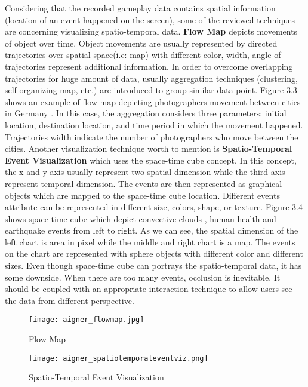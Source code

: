 Considering that the recorded gameplay data contains spatial information (location of an event happened on the screen), some of the reviewed techniques are concerning visualizing spatio-temporal data. \textbf{Flow Map} depicts movements of object over time. Object movements are usually represented by directed trajectories over spatial space(i.e: map) with different color, width, angle of trajectories represent additional information. In order to overcome overlapping trajectories for huge amount of data, usually aggregation techniques (clustering, self organizing map, etc.) are introduced to group similar data point. Figure 3.3 shows an example of flow map depicting photographers movement between cities in Germany \cite{adrienko}. In this case, the aggregation considers three parameters: initial location, destination location, and time period in which the movement happened. Trajectories width indicate the number of photographers who move between the cities. Another visualization technique worth to mention is \textbf{Spatio-Temporal Event Visualization} which uses the space-time cube concept. In this concept, the x and y axis usually represent two spatial dimension while the third axis represent temporal dimension. The events are then represented as graphical objects which are mapped to the space-time cube location. Different events attribute can be represented in different size, colors, shape, or texture. Figure 3.4 shows space-time cube which depict convective clouds \cite{turdukulov}, human health \cite{tominski} and earthquake events \cite{gatalsky} from left to right. As we can see, the  spatial dimension of the left chart is area in pixel while the middle and right chart is a map. The events on the chart are represented with sphere objects with different color and different sizes. Even though space-time cube can portrays the spatio-temporal data, it has some downside. When there are too many events, occlusion is inevitable. It should be coupled with an appropriate interaction technique to allow users see the data from different perspective.

\begin{figure}
\centering
\texttt{[image: aigner\_flowmap.jpg]}
\caption{Flow Map}
\end{figure}

\begin{figure}
\centering
\texttt{[image: aigner\_spatiotemporaleventviz.png]}
\caption{Spatio-Temporal Event Visualization}
\end{figure}

